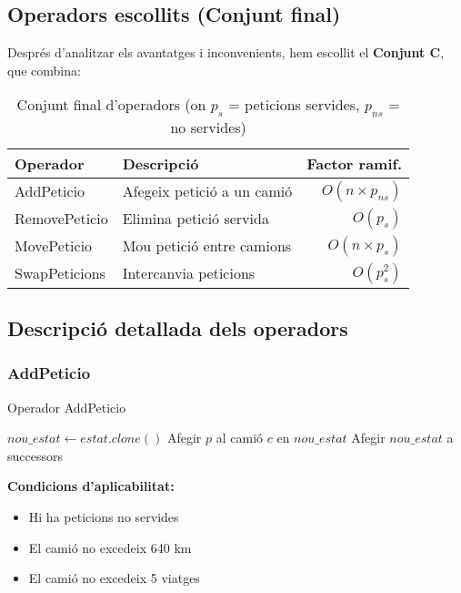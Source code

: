 \subsection{Operadors escollits (Conjunt final)}

Després d'analitzar els avantatges i inconvenients, hem escollit el \textbf{Conjunt C}, que combina:

\begin{table}[H]
\centering
\begin{tabular}{@{}llr@{}}
\toprule
\textbf{Operador} & \textbf{Descripció} & \textbf{Factor ramif.} \\
\midrule
AddPeticio & Afegeix petició a un camió & $O(n \times p_{ns})$ \\
RemovePeticio & Elimina petició servida & $O(p_s)$ \\
MovePeticio & Mou petició entre camions & $O(n \times p_s)$ \\
SwapPeticions & Intercanvia peticions & $O(p_s^2)$ \\
\bottomrule
\end{tabular}
\caption{Conjunt final d'operadors (on $p_s$ = peticions servides, $p_{ns}$ = no servides)}
\label{tab:operators-final}
\end{table}

\subsection{Descripció detallada dels operadors}

\subsubsection{AddPeticio}

\begin{algorithm}[H]
\caption{Operador AddPeticio}
\begin{algorithmic}[1]
        \State $nou\_estat \gets estat.clone()$
        \State Afegir $p$ al camió $c$ en $nou\_estat$
            \State Afegir $nou\_estat$ a successors
        \EndIf
    \EndFor
\EndFor
\end{algorithmic}
\end{algorithm}

\textbf{Condicions d'aplicabilitat:}
\begin{itemize}
    \item Hi ha peticions no servides
    \item El camió no excedeix 640 km
    \item El camió no excedeix 5 viatges
\end{itemize}

